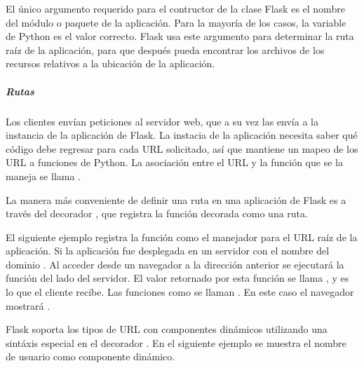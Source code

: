 El único argumento requerido para el contructor de la clase Flask es el nombre
del módulo o paquete de la aplicación. Para la mayoría de los casos,
la variable de Python  es el valor correcto. Flask usa este argumento
para determinar la ruta raíz de la aplicación, para que después pueda encontrar
los archivos de los recursos relativos a la ubicación de la aplicación.


\subparagraph{Rutas}
\label{\detokenize{chapter_two/desc_cloudnao:rutas}}
Los clientes envían peticiones al servidor web, que a su vez las envía a la
instancia de la aplicación de Flask. La instacia de la aplicación necesita saber
qué código debe regresar para cada URL solicitado, así que mantiene un mapeo de
los URL a funciones de Python. La asociación entre el URL y la función que se
la maneja se llama .

La manera más conveniente de definir una ruta en una aplicación de Flask es
a través del decorador , que registra la función decorada como
una ruta.

El siguiente ejemplo registra la función  como el manejador para el URL
raíz de la aplicación. Si la aplicación fue desplegada en un servidor con el
nombre del dominio . Al acceder desde un navegador a
la dirección anterior se ejecutará la función  del lado del servidor.
El valor
retornado por esta función se llama , y es lo que el cliente recibe.
Las funciones como  se llaman .
En este caso el navegador mostrará .

\begin{sphinxVerbatim}[commandchars=\\\{\}]
 
   
\end{sphinxVerbatim}

Flask soporta los tipos de URL con componentes dinámicos utilizando
una sintáxis especial en el decorador . En el siguiente ejemplo se
muestra el nombre de usuario como componente dinámico.

\begin{sphinxVerbatim}[commandchars=\\\{\}]
 
   
\end{sphinxVerbatim}

